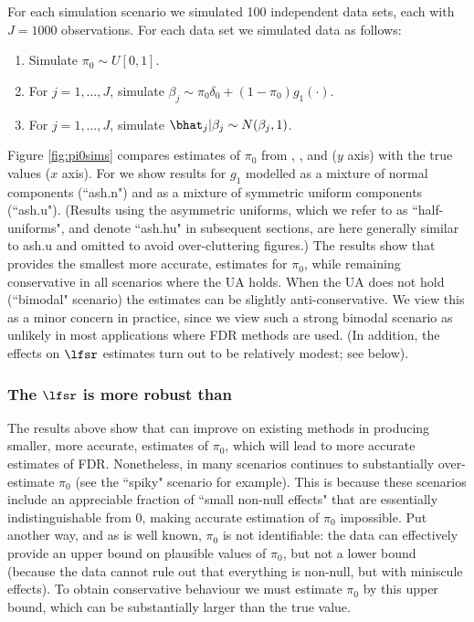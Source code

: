 For each simulation scenario we simulated 100 independent data sets, each with $J=1000$ observations. For each data set we simulated
data as follows:

\begin{enumerate}
\item Simulate $\pi_0  \sim U[0,1]$.
\item For $j=1,\dots,J$, simulate $\beta_j \sim \pi_0 \delta_0 + (1-\pi_0) g_1(\cdot)$.
\item For $j=1,\dots,J$, simulate $\bhat_j | \beta_j \sim N(\beta_j,1)$.
\end{enumerate}

Figure \ref{fig:pi0sims} compares estimates of $\pi_0$ from \qvalue, \locfdr, \mixfdr and \ashr ($y$ axis) with the true values ($x$ axis). 
For \ashr we show results for $g_1$ modelled as a mixture of normal components (``ash.n") 
and as a mixture of symmetric uniform components (``ash.u"). (Results using the asymmetric uniforms, which we refer to
as ``half-uniforms", and denote ``ash.hu" in subsequent sections, are here generally similar to ash.u and omitted to avoid over-cluttering figures.)
The results show that \ashr provides the smallest more accurate, estimates for $\pi_0$, while remaining conservative
in all scenarios where the UA holds. When the UA does not hold (``bimodal" scenario) the \ashr estimates can be slightly anti-conservative.
We view this as a minor concern in practice, since we view such a strong bimodal scenario as unlikely in most applications where FDR methods
are used. (In addition, the effects on $\lfsr$ estimates turn out to be relatively modest; see below).

\subsubsection*{The $\lfsr$ is more robust than \lfdr}

The results above show that \ashr can improve on existing methods in producing smaller, more accurate, 
estimates of $\pi_0$, which will lead to more accurate estimates of FDR.
Nonetheless, in many scenarios \ashr continues
to substantially over-estimate $\pi_0$ (see the ``spiky" scenario for example). 
This is because these scenarios include 
an appreciable fraction of ``small non-null effects" that are essentially indistinguishable from 0, making accurate
estimation of $\pi_0$ impossible. Put another way, and as is well known, $\pi_0$ is not identifiable:
 the data can effectively provide an upper bound on plausible values of $\pi_0$,
but not a lower bound (because the data cannot rule out that everything is non-null, but with miniscule effects).
To obtain conservative behaviour we must estimate $\pi_0$ by this upper bound, which can
be substantially larger than the true value.

